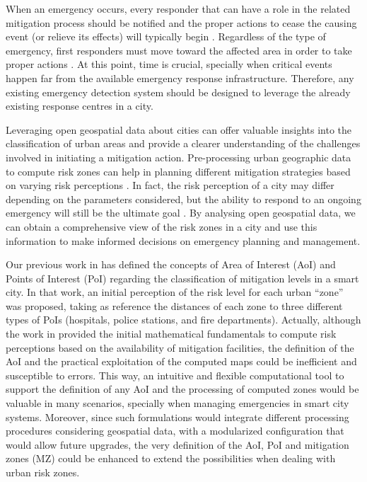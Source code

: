 \begin{refsection}
When an emergency occurs, every responder that can have a role in the related mitigation process should be notified and the proper actions to cease the causing event (or relieve its effects) will typically begin \cite{Costa_2020,emergencies2}. Regardless of the type of emergency, first responders must move toward the affected area in order to take proper actions \cite{emergencies3}. At this point, time is crucial, specially when critical events happen far from the available emergency response infrastructure. Therefore, any existing emergency detection system should be designed to leverage the already existing response centres in a city.

Leveraging open geospatial data about cities can offer valuable insights into the classification of urban areas and provide a clearer understanding of the challenges involved in initiating a mitigation action. Pre-processing urban geographic data to compute risk zones can help in planning different mitigation strategies based on varying risk perceptions \cite{riskcities}. In fact, the risk perception of a city may differ depending on the parameters considered, but the ability to respond to an ongoing emergency will still be the ultimate goal \cite{emergencies3}. By analysing open geospatial data, we can obtain a comprehensive view of the risk zones in a city and use this information to make informed decisions on emergency planning and management.

Our previous work in \cite{riskzones} has defined the concepts of Area of Interest (AoI) and Points of Interest (PoI) regarding the classification of mitigation levels in a smart city. In that work, an initial perception of the risk level for each urban ``zone'' was proposed, taking as reference the distances of each zone to three different types of PoIs (hospitals, police stations, and fire departments). Actually, although the work in \cite{riskzones} provided the initial mathematical fundamentals to compute risk perceptions based on the availability of mitigation facilities, the definition of the AoI and the practical exploitation of the computed maps could be inefficient and susceptible to errors. This way, an intuitive and flexible computational tool to support the definition of any AoI and the processing of computed zones would be valuable in many scenarios, specially when managing emergencies in smart city systems. Moreover, since such formulations would integrate different processing procedures considering geospatial data, with a modularized configuration that would allow future upgrades, the very definition of the AoI, PoI and mitigation zones (MZ) could be enhanced to extend the possibilities when dealing with urban risk zones.


\end{refsection}
